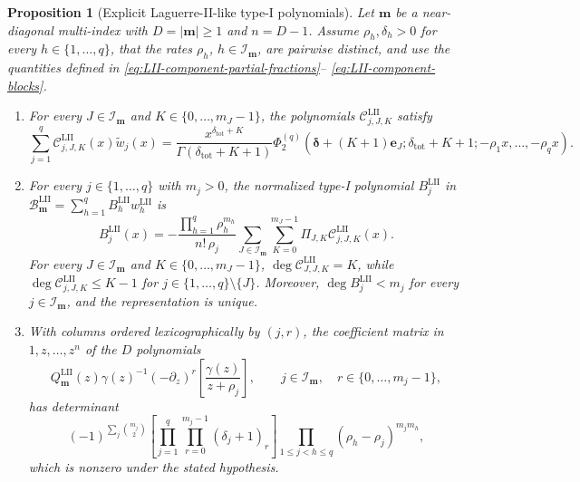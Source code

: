 \documentclass[10pt]{amsart}
\newcommand{\mm}{\boldsymbol m}
\newcommand{\ee}{\boldsymbol e}
\newcommand{\abs}[1]{\lvert#1\rvert}
\theoremstyle{plain}
\newtheorem{proposition}[theorem]{Proposition}
\theoremstyle{definition}
\theoremstyle{remark}
\begin{document}
\begin{proposition}[Explicit Laguerre-II-like type-I polynomials]
\label{prop:LII-explicit-components}
Let \(\mm\) be a near-diagonal multi-index with
\(D=\abs\mm\ge1\) and \(n=D-1\). Assume
\(\rho_h,\delta_h>0\) for every \(h\in\{1,\ldots,q\}\), that the rates
\(\rho_h\), \(h\in\mathcal I_{\mm}\), are pairwise distinct, and use the
quantities defined in \eqref{eq:LII-component-partial-fractions}--
\eqref{eq:LII-component-blocks}.
\begin{enumerate}[label=\textnormal{(\roman*)}]
\item For every \(J\in\mathcal I_{\mm}\) and
\(K\in\{0,\ldots,m_J-1\}\), the polynomials
\(\mathcal C_{j,J,K}^{\mathrm{LII}}\) satisfy
\begin{equation}
 \sum_{j=1}^q\mathcal C_{j,J,K}^{\mathrm{LII}}(x)\widetilde w_j(x)
 =\frac{x^{\delta_{\mathrm{tot}}+K}}
 {\Gamma(\delta_{\mathrm{tot}}+K+1)}
 \Phi_2^{(q)}
 \left(
 \boldsymbol\delta+(K+1)\ee_J;\delta_{\mathrm{tot}}+K+1;
 -\rho_1x,\ldots,-\rho_qx
 \right).
 \label{eq:LII-component-Phi2-block}
\end{equation}
\item For every \(j\in\{1,\ldots,q\}\) with \(m_j>0\), the normalized type-I polynomial
\(B_j^{\mathrm{LII}}\) in
\(\mathcal B_{\mm}^{\mathrm{LII}}
=\sum_{h=1}^qB_h^{\mathrm{LII}}w_h^{\mathrm{LII}}\) is
\begin{equation}
 B_j^{\mathrm{LII}}(x)
 =-\frac{\prod_{h=1}^q\rho_h^{m_h}}{n!\,\rho_j}
 \sum_{J\in\mathcal I_{\mm}}
 \sum_{K=0}^{m_J-1}\Pi_{J,K}
 \mathcal C_{j,J,K}^{\mathrm{LII}}(x).
 \label{eq:LII-explicit-components}
\end{equation}
For every \(J\in\mathcal I_{\mm}\) and
\(K\in\{0,\ldots,m_J-1\}\),
\(\deg \mathcal C_{J,J,K}^{\mathrm{LII}}=K\), while
\(\deg \mathcal C_{j,J,K}^{\mathrm{LII}}\le K-1\) for
\(j\in\{1,\ldots,q\}\setminus\{J\}\). Moreover,
\(\deg B_j^{\mathrm{LII}}<m_j\) for every
\(j\in\mathcal I_{\mm}\), and the representation is unique.

\item With columns ordered lexicographically by \((j,r)\), the coefficient
matrix in \(1,z,\ldots,z^n\) of the \(D\) polynomials
\[
 Q_{\mm}^{\mathrm{LII}}(z)\gamma(z)^{-1}(-\partial_z)^r
 \left[\frac{\gamma(z)}{z+\rho_j}\right],
 \qquad j\in\mathcal I_{\mm},\quad
 r\in\{0,\ldots,m_j-1\},
\]
has determinant
\begin{equation}
 (-1)^{\sum_j\binom{m_j}{2}}
 \left[\prod_{j=1}^q\prod_{r=0}^{m_j-1}(\delta_j+1)_r\right]
 \prod_{1\le j<h\le q}
 (\rho_h-\rho_j)^{m_jm_h},
 \label{eq:LII-component-determinant}
\end{equation}
which is nonzero under the stated hypothesis.
\end{enumerate}
\end{proposition}
\end{document}
